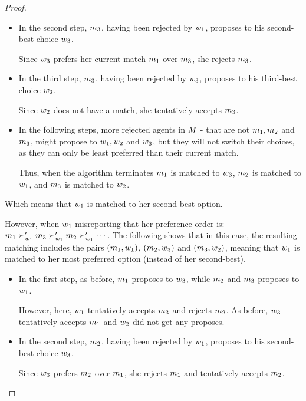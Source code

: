 \begin{proof}
\begin{itemize}
        \item In the second step, $m_3$, having been rejected by $w_1$, proposes to his second-best choice $w_3$.

        Since $w_3$ prefers her current match $m_1$ over $m_3$,  she rejects $m_3$.

        \item In the third step, $m_3$, having been rejected by $w_3$, proposes to his third-best choice $w_2$.

        Since $w_2$ does not have a match, she tentatively accepts $m_3$.


        \item In the following steps, more rejected agents in $M$ - that are not $m_1, m_2$ and $m_3$, might propose to $w_1, w_2$ and $w_3$, but they will not switch their choices, as they can only be least preferred than their current match. 
        
        Thus, when the algorithm terminates $m_1$ is matched to $w_3$, $m_2$ is matched to $w_1$, and $m_3$ is matched to $w_2$. 
    \end{itemize}
    Which means that $w_1$ is matched to her second-best option.


    However, when $w_1$ misreporting that her preference order is: $m_1 \succ'_{w_1} m_3 \succ'_{w_1} m_2 \succ'_{w_1} \cdots$.
    The following shows that in this case, the resulting matching includes the pairs $(m_1, w_1)$, $(m_2, w_3)$ and $(m_3, w_2)$, meaning that $w_1$ is matched to her most preferred option (instead of her second-best).
    \begin{itemize}
        \item In the first step, as before, $m_1$ proposes to $w_3$, while $m_2$ and $m_3$ proposes to $w_1$.

        However, here,  $w_1$ tentatively accepts $m_3$ and rejects $m_2$.
        As before, $w_3$ tentatively accepts $m_1$ and $w_2$ did not get any proposes.


        \item In the second step, $m_2$, having been rejected by $w_1$, proposes to his second-best choice $w_3$.

        Since $w_3$ prefers $m_2$ over $m_1$,  she rejects $m_1$ and tentatively accepts $m_2$.



\end{itemize}
\end{proof}
